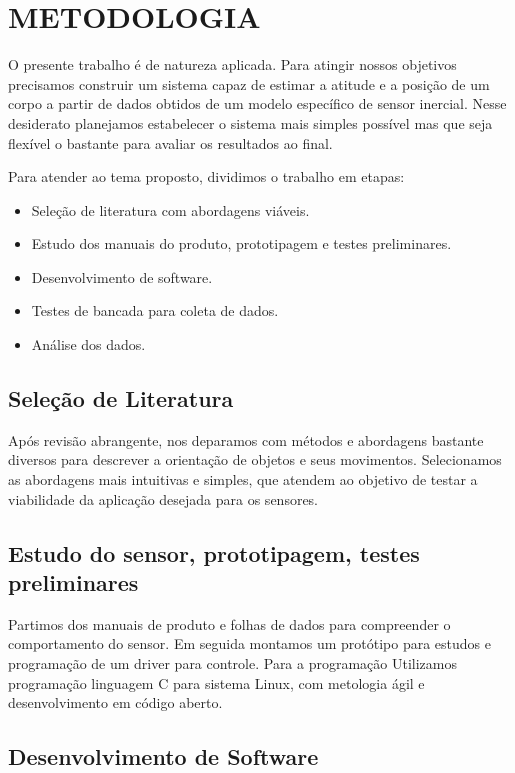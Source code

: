 \chapter{METODOLOGIA}\label{chap:metodologia}

O presente trabalho é de natureza aplicada. Para atingir nossos objetivos precisamos construir um sistema capaz de estimar a atitude e a posição de um corpo a partir de dados obtidos de um modelo específico de sensor inercial. Nesse desiderato planejamos estabelecer o sistema mais simples possível mas que seja flexível o bastante para avaliar os resultados ao final.

Para atender ao tema proposto, dividimos o trabalho em etapas:
\begin{itemize}
    \item Seleção de literatura com abordagens viáveis.
    \item Estudo dos manuais do produto, prototipagem e testes preliminares.
    \item Desenvolvimento de software.
    \item Testes de bancada para coleta de dados.
    \item Análise dos dados.
\end{itemize}

\section{Seleção de Literatura}

Após revisão abrangente, nos deparamos com métodos e abordagens bastante diversos para descrever a orientação de objetos e seus movimentos. Selecionamos as abordagens mais intuitivas e simples, que atendem ao objetivo de testar a viabilidade da aplicação desejada para os sensores.

\section{Estudo do sensor, prototipagem, testes preliminares}

Partimos dos manuais de produto e folhas de dados para compreender o comportamento do sensor. Em seguida montamos um protótipo para estudos e programação de um driver para controle. Para a programação Utilizamos programação linguagem C para sistema Linux, com metologia ágil e desenvolvimento em código aberto.

\section{Desenvolvimento de Software}


